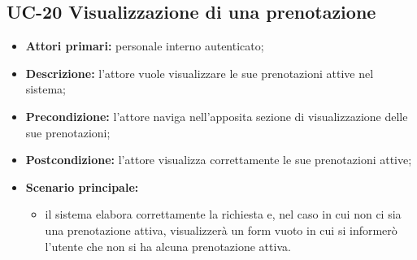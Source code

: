 \subsection{UC-20 Visualizzazione di una prenotazione}
\begin{itemize}
\item \textbf{Attori primari:} personale interno autenticato;
\item \textbf{Descrizione:} l'attore vuole visualizzare le sue prenotazioni attive nel sistema;
\item \textbf{Precondizione:} l'attore naviga nell’apposita sezione di visualizzazione delle sue prenotazioni;
\item \textbf{Postcondizione:} l'attore visualizza correttamente le sue prenotazioni attive;
\item \textbf{Scenario principale:} 
	\begin{itemize}
		\item il sistema elabora correttamente la richiesta e, nel caso in cui non ci sia una prenotazione attiva, visualizzerà un form vuoto in cui si informerò l'utente che non si ha alcuna prenotazione attiva.
	\end{itemize}
\end{itemize}


